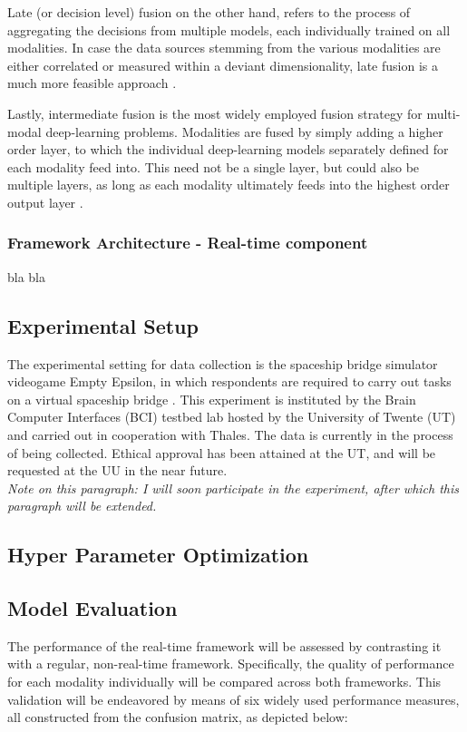 \documentclass{article}
\begin{document}
Late (or decision level) fusion on the other hand, refers to the process of aggregating the decisions from multiple models, each individually trained on all modalities. In case the data sources stemming from the various modalities are either correlated or measured within a deviant dimensionality, late fusion is a much more feasible approach \cite{ramachandram2017deep}.

Lastly, intermediate fusion is the most widely employed fusion strategy for multi-modal deep-learning problems. Modalities are fused by simply adding a higher order layer, to which the individual deep-learning models separately defined for each modality feed into. This need not be a single layer, but could also be multiple layers, as long as each modality ultimately feeds into the highest order output layer \cite{ramachandram2017deep}.

\subsubsection{Framework Architecture - Real-time component}
bla bla 

\subsection{Experimental Setup}
The experimental setting for data collection is the spaceship bridge simulator videogame Empty Epsilon, in which respondents are required to carry out tasks on a virtual spaceship bridge \cite{daid2016empty}. This experiment is instituted by the Brain Computer Interfaces (BCI) testbed lab hosted by the University of Twente (UT) and carried out in cooperation with Thales. The data is currently in the process of being collected. Ethical approval has been attained at the UT, and will be requested at the UU in the near future.\\  
\textit{Note on this paragraph: I will soon participate in the experiment, after which this paragraph will be extended.}


\subsection{Hyper Parameter Optimization}


\subsection{Model Evaluation}
The performance of the real-time framework will be assessed by contrasting it with a regular, non-real-time framework. Specifically, the quality of performance for each modality individually will be compared across both frameworks. This validation will be endeavored by means of six widely used performance measures, all constructed from the confusion matrix, as depicted below:  
\end{document}

